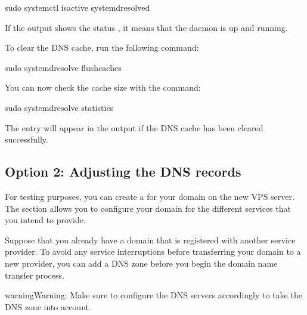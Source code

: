 \documentclass[letterpaper,10pt,english]{sphinxmanual}
\begin{document}
\begin{sphinxVerbatim}[commandchars=\\\{\}]
\PYGZdl{} sudo systemctl is\PYGZhy{}active systemd\PYGZhy{}resolved
\end{sphinxVerbatim}

\sphinxAtStartPar
If the output shows the status , it means that the daemon is up and running.

\sphinxAtStartPar
To clear the DNS cache, run the following command:

\begin{sphinxVerbatim}[commandchars=\\\{\}]
\PYGZdl{} sudo systemd\PYGZhy{}resolve \PYGZhy{}\PYGZhy{}flush\PYGZhy{}caches
\end{sphinxVerbatim}

\sphinxAtStartPar
You can now check the cache size with the command:

\begin{sphinxVerbatim}[commandchars=\\\{\}]
\PYGZdl{} sudo systemd\PYGZhy{}resolve \PYGZhy{}\PYGZhy{}statistics
\end{sphinxVerbatim}

\sphinxAtStartPar
The entry  will appear in the output if the DNS cache has been cleared successfully.


\subsection{Option 2: Adjusting the DNS records}
\label{\detokenize{joomla-to-vps:option-2-adjusting-the-dns-records}}
\sphinxAtStartPar
For testing purposes, you can create a  for your domain on the new VPS server. The  section allows you to configure your domain for the different services that you intend to provide.

\sphinxAtStartPar
Suppose that you already have a domain that is registered with another service provider. To avoid any service interruptions before transferring your domain to a new provider, you can add a DNS zone before you begin the domain name transfer process.

\begin{sphinxadmonition}{warning}{Warning:}
\sphinxAtStartPar
Make sure to configure the DNS servers accordingly to take the DNS zone into account.
\end{sphinxadmonition}
\end{document}
